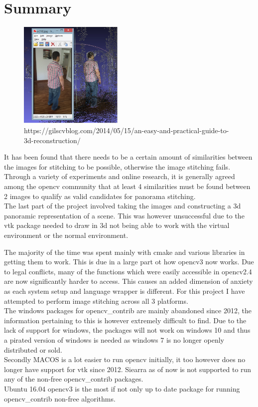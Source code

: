 \documentclass{article}
\begin{document}
\pagebreak
\section{Summary}\label{sec:overview}
\begin{figure}
	\centering
	\includegraphics[width=5cm]{reconstruction2.jpg}
	\caption{https://gilscvblog.com/2014/05/15/an-easy-and-practical-guide-to-3d-reconstruction/}
\end{figure}
It has been found that there needs to be a certain amount of similarities between the images for stitching to be possible, otherwise the image stitching fails. Through a variety of experiments and online research, it is generally agreed among the opencv community that at least 4 similarities must be found between 2 images to qualify as valid candidates for panorama stitching.\\

The last part of the project involved taking the images and constructing a 3d panoramic representation of a scene. This was however unsuccessful due to the vtk package needed to draw in 3d not being able to work with the virtual environment or the normal environment.


The majority of the time was spent mainly with cmake and various libraries in getting them to work. This is due in a large part ot how opencv3 now works. Due to legal conflicts, many of the functions which were easily accessible in opencv2.4 are now significantly harder to access. This causes an added dimension of anxiety as each system setup and language wrapper is different. For this project I have attempted to perform image stitching across all 3 platforms.\\
The windows  packages for opencv\_contrib are mainly abandoned since 2012, the information pertaining to this is however extremely difficult to find. Due to the lack of support for windows, the packages will not work on windows 10 and thus a pirated version of windows is needed as windows 7 is no longer openly distributed or sold. \\
Secondly MACOS is a lot easier to run opencv initially, it too however does no longer have support for vtk since 2012. Siearra as of now is not supported to run any of the non-free opencv\_contrib packages.\\
Ubuntu 16.04 opencv3 is the most if not only up to date package for running opencv\_contrib non-free algorithms.\\
\end{document}
